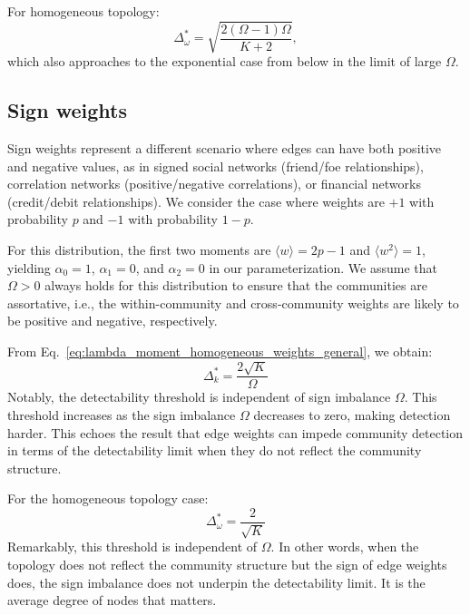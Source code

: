 \documentclass[a4paper,pre,superscriptaddress,floatfix,nofootinbib,twocolumn]{revtex4-1}
\begin{document}
For homogeneous topology:
\begin{equation}
\Delta_\omega^* = \sqrt{\frac{2(\Omega - 1)\Omega}{K+2}},
\label{eq:geometric_w_det}
\end{equation}
which also approaches to the exponential case from below in the limit of large $\Omega$.



\subsection*{Sign weights}

Sign weights represent a different scenario where edges can have both positive and negative values, as in signed social networks (friend/foe relationships), correlation networks (positive/negative correlations), or financial networks (credit/debit relationships). We consider the case where weights are $+1$ with probability $p$ and $-1$ with probability $1-p$.

For this distribution, the first two moments are $\langle w \rangle = 2p - 1$ and $\langle w^2 \rangle = 1$, yielding $\alpha_0 = 1$, $\alpha_1 = 0$, and $\alpha_2 = 0$ in our parameterization. We assume that $\Omega > 0$ always holds for this distribution to ensure that the communities are assortative, i.e., the within-community and cross-community weights are likely to be positive and negative, respectively.

From Eq.~\eqref{eq:lambda_moment_homogeneous_weights_general}, we obtain:
\begin{equation}
\Delta_k^* = \frac{2\sqrt{K}}{\Omega}
\label{eq:sign_det}
\end{equation}
Notably, the detectability threshold is independent of sign imbalance $\Omega$.
This threshold increases as the sign imbalance $\Omega$ decreases to zero, making detection harder. This echoes the result that edge weights can impede community detection  in terms of the detectability limit when they do not reflect the community structure.

For the homogeneous topology case:
\begin{equation}
\Delta_\omega^* = \frac{2}{\sqrt{K}}
\label{eq:sign_w_det}
\end{equation}
Remarkably, this threshold is independent of $\Omega$.
In other words, when the topology does not reflect the community structure but the sign of edge weights does, the sign imbalance does not underpin the detectability limit. It is the average degree of nodes that matters.
\end{document}
